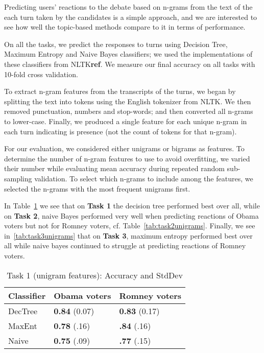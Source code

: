 
Predicting users' reactions to the debate based on n-grams from the text of the each turn taken by the candidates is a simple approach, and we are interested to see how well the topic-based methods compare to it in terms of performance.

On all the tasks, we predict the responses to turns using Decision Tree, Maximum Entropy and Naive Bayes classifiers; we used the implementations of these classifiers from NLTK\textbf{ref}.  We measure our final accuracy on all tasks with 10-fold cross validation.  

To extract n-gram features from the transcripts of the turns, we began by splitting the text into tokens using the English tokenizer from NLTK.  We then removed punctuation, numbers and stop-words; and then converted all n-grams to lower-case.  Finally, we produced a single feature for each unique n-gram in each turn indicating is presence (not the count of tokens for that n-gram).  

For our evaluation, we considered either unigrams or bigrams as features.  To determine the number of n-gram features to use to avoid overfitting, we varied their number while evaluating mean accuracy during repeated random sub-sampling validation.  To select which n-grams to include among the features, we selected the n-grams with the most frequent unigrams first.

In Table~\ref{tab:task1unigrams} we see that on \textbf{Task 1} the decision tree performed best over all, while on \textbf{Task 2}, naive Bayes performed very well when predicting reactions of Obama voters but not for Romney voters, cf. Table~\ref{tab:task2unigrams}.  Finally, we see in~\ref{tab:task3unigrams} that on \textbf{Task 3}, maximum entropy performed best over all while naive bayes continued to struggle at predicting reactions of Romney voters.

\begin{table}[H]
\begin{centering}
\begin{tabular}{ l | l | l }
Classifier & Obama voters & Romney voters \\
\hline
DecTree & \textbf{0.84} (0.07) &  \textbf{0.83} (0.17) \\
MaxEnt & \textbf{0.78} (.16) &  \textbf{.84} (.16) \\
Naive & \textbf{0.75} (.09) &  \textbf{.77} (.15) \\
\end{tabular}
\caption{Task 1 (unigram features): Accuracy and StdDev}
\label{tab:task1unigrams}
\end{centering}
\end{table}

